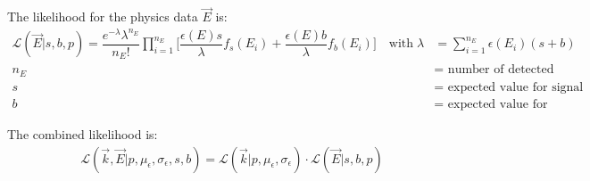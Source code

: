 The likelihood for the physics data $\vec{E}$ is:
\begin{align}
    \mathcal{L}(\vec{E}|s,b,p) = \dfrac{e^{-\lambda}\lambda^{n_E}}{n_E!} \prod \limits_{i=1}^{n_E}\Big[ \dfrac{\epsilon(E)s}{\lambda} f_s(E_i) + \dfrac{\epsilon(E)b}{\lambda}f_b(E_i)\Big] \quad \text{with} \; \lambda&=\sum \limits_{i=1}^{n_E} \epsilon(E_i)(s+b) \nonumber \\ n_E &= \text{ number of detected events} \nonumber \\ s&= \text{ expected value for signal events} \nonumber \\ b&= \text{ expected value for background events}
\end{align}

The combined likelihood is: 
\begin{align}
    \mathcal{L}(\vec{k},\vec{E}|p, \mu_\epsilon, \sigma_\epsilon, s, b) = \mathcal{L}(\vec{k}|p,\mu_\epsilon,\sigma_\epsilon) \cdot \mathcal{L}(\vec{E}|s,b,p)
\end{align}